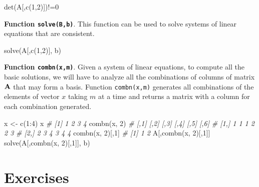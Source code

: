 \documentclass[
]{article}
\newenvironment{Shaded}{\begin{snugshade}}{\end{snugshade}}
\newcommand{\CommentTok}[1]{\textcolor[rgb]{0.56,0.35,0.01}{\textit{#1}}}
\newcommand{\DecValTok}[1]{\textcolor[rgb]{0.00,0.00,0.81}{#1}}
\newcommand{\FunctionTok}[1]{\textcolor[rgb]{0.00,0.00,0.00}{#1}}
\newcommand{\NormalTok}[1]{#1}
\newcommand{\OtherTok}[1]{\textcolor[rgb]{0.56,0.35,0.01}{#1}}
\newcommand{\SpecialCharTok}[1]{\textcolor[rgb]{0.00,0.00,0.00}{#1}}
\begin{document}
\begin{Shaded}
\begin{Highlighting}[]
\FunctionTok{det}\NormalTok{(A[,}\FunctionTok{c}\NormalTok{(}\DecValTok{1}\NormalTok{,}\DecValTok{2}\NormalTok{)])}\SpecialCharTok{!=}\DecValTok{0}
\end{Highlighting}
\end{Shaded}

\textbf{Function \texttt{solve(B,b)}}. This function can be used to
solve systems of linear equations that are consistent.

\begin{Shaded}
\begin{Highlighting}[]
\FunctionTok{solve}\NormalTok{(A[,}\FunctionTok{c}\NormalTok{(}\DecValTok{1}\NormalTok{,}\DecValTok{2}\NormalTok{)], b)}
\end{Highlighting}
\end{Shaded}

\textbf{Function \texttt{combn(x,m)}}. Given a system of linear
equations, to compute all the basic solutions, we will have to analyze
all the combinations of columns of matrix \({\bf A}\) that may form a
basis. Function \texttt{combn(x,m)} generates all combinations of the
elements of vector \(x\) taking \(m\) at a time and returns a matrix
with a column for each combination generated.

\begin{Shaded}
\begin{Highlighting}[]
\NormalTok{x }\OtherTok{\textless{}{-}} \FunctionTok{c}\NormalTok{(}\DecValTok{1}\SpecialCharTok{:}\DecValTok{4}\NormalTok{)}
\NormalTok{x}
\CommentTok{\# [1] 1 2 3 4}
\FunctionTok{combn}\NormalTok{(x, }\DecValTok{2}\NormalTok{)}
\CommentTok{\#     [,1] [,2] [,3] [,4] [,5] [,6]}
\CommentTok{\# [1,]  1    1    1    2    2    3}
\CommentTok{\# [2,]  2    3    4    3    4    4}
\FunctionTok{combn}\NormalTok{(x, }\DecValTok{2}\NormalTok{)[,}\DecValTok{1}\NormalTok{]}
\CommentTok{\# [1] 1 2}
\NormalTok{A[,}\FunctionTok{combn}\NormalTok{(x, }\DecValTok{2}\NormalTok{)[,}\DecValTok{1}\NormalTok{]]}
\FunctionTok{solve}\NormalTok{(A[,}\FunctionTok{combn}\NormalTok{(x, }\DecValTok{2}\NormalTok{)[,}\DecValTok{1}\NormalTok{]], b)}
\end{Highlighting}
\end{Shaded}

\hypertarget{exercises}{%
\section{Exercises}\label{exercises}}
\end{document}
